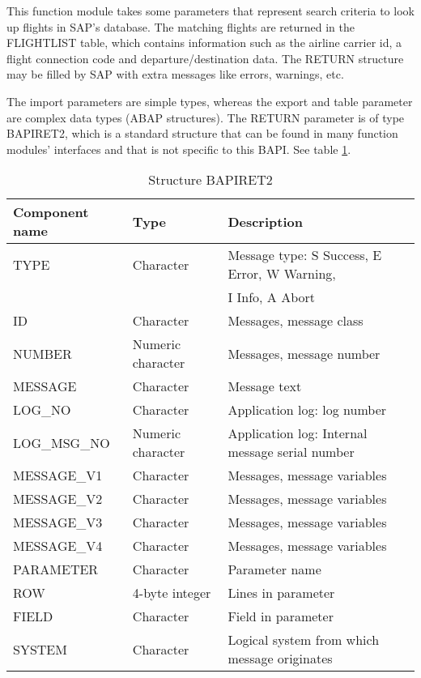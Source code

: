 This function module takes some parameters that represent search criteria to look up flights in SAP's database.
The matching flights are returned in the FLIGHTLIST table, which contains information such as
the airline carrier id, a flight connection code and departure/destination data.
The RETURN structure may be filled by SAP with extra messages like errors, warnings, etc.

The import parameters are simple types, whereas the export and table parameter are complex data types (ABAP structures).
The RETURN parameter is of type BAPIRET2, which is a standard structure that can be found in many function modules'
interfaces and that is not specific to this BAPI. See table \ref{tab:Bapiret2}.

\begin{table}[H]
  \centering
  \begin{tabular}{lll} \toprule 
    \textbf{Component name} & \textbf{Type}     & \textbf{Description} \\ \midrule
    TYPE                  & Character               & Message type: S Success, E Error, W Warning, \\ 
                             &                             & I Info, A Abort \\ 
    ID                      & Character                & Messages, message class \\  
    NUMBER              & Numeric character   & Messages, message number \\ 
    MESSAGE             & Character               & Message text \\ 
    LOG\_NO            & Character                & Application log: log number \\ 
    LOG\_MSG\_NO   & Numeric character    & Application log: Internal message serial number \\ 
    MESSAGE\_V1      & Character               & Messages, message variables \\ 
    MESSAGE\_V2      & Character               & Messages, message variables \\ 
    MESSAGE\_V3      & Character               & Messages, message variables \\ 
    MESSAGE\_V4      & Character               & Messages, message variables \\ 
    PARAMETER          & Character              & Parameter name \\ 
    ROW                    & 4-byte integer        & Lines in parameter \\ 
    FIELD                   & Character              & Field in parameter \\ 
    SYSTEM                & Character              & Logical system from which message originates \\ \bottomrule
  \end{tabular}
  \caption{Structure BAPIRET2}
  \label{tab:Bapiret2}
\end{table}

